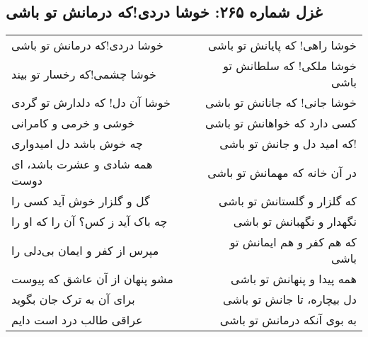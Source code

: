 \begin{center}
\section*{غزل شماره ۲۶۵: خوشا دردی!که درمانش تو باشی}
\label{sec:265}
\begin{longtable}{l p{0.5cm} r}
خوشا دردی!که درمانش تو باشی
&&
خوشا راهی! که پایانش تو باشی
\\
خوشا چشمی!که رخسار تو بیند
&&
خوشا ملکی! که سلطانش تو باشی
\\
خوشا آن دل! که دلدارش تو گردی
&&
خوشا جانی! که جانانش تو باشی
\\
خوشی و خرمی و کامرانی
&&
کسی دارد که خواهانش تو باشی
\\
چه خوش باشد دل امیدواری
&&
که امید دل و جانش تو باشی!
\\
همه شادی و عشرت باشد، ای دوست
&&
در آن خانه که مهمانش تو باشی
\\
گل و گلزار خوش آید کسی را
&&
که گلزار و گلستانش تو باشی
\\
چه باک آید ز کس؟ آن را که او را
&&
نگهدار و نگهبانش تو باشی
\\
مپرس از کفر و ایمان بی‌دلی را
&&
که هم کفر و هم ایمانش تو باشی
\\
مشو پنهان از آن عاشق که پیوست
&&
همه پیدا و پنهانش تو باشی
\\
برای آن به ترک جان بگوید
&&
دل بیچاره، تا جانش تو باشی
\\
عراقی طالب درد است دایم
&&
به بوی آنکه درمانش تو باشی
\\
\end{longtable}
\end{center}
